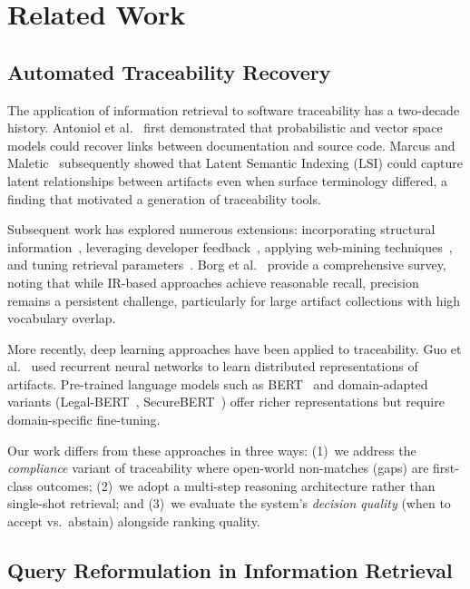 \documentclass{sn-jnl}
\begin{document}
\section{Related Work}
\label{sec:related}

\subsection{Automated Traceability Recovery}

The application of information retrieval to software traceability has a two-decade history.
Antoniol et al.~\cite{Antoniol2002} first demonstrated that probabilistic and vector space models could recover links between documentation and source code.
Marcus and Maletic~\cite{MarcusMaletic2003} subsequently showed that Latent Semantic Indexing (LSI) could capture latent relationships between artifacts even when surface terminology differed, a finding that motivated a generation of traceability tools.

Subsequent work has explored numerous extensions: incorporating structural information~\cite{McMillan2009}, leveraging developer feedback~\cite{Cuddeback2010}, applying web-mining techniques~\cite{Ali2013}, and tuning retrieval parameters~\cite{Oliveto2010}.
Borg et al.~\cite{Borg2014} provide a comprehensive survey, noting that while IR-based approaches achieve reasonable recall, precision remains a persistent challenge, particularly for large artifact collections with high vocabulary overlap.

More recently, deep learning approaches have been applied to traceability.
Guo et al.~\cite{Guo2017} used recurrent neural networks to learn distributed representations of artifacts.
Pre-trained language models such as BERT~\cite{Devlin2019} and domain-adapted variants (Legal-BERT~\cite{Chalkidis2020}, SecureBERT~\cite{Aghaei2022}) offer richer representations but require domain-specific fine-tuning.

Our work differs from these approaches in three ways: (1)~we address the \emph{compliance} variant of traceability where open-world non-matches (gaps) are first-class outcomes; (2)~we adopt a multi-step reasoning architecture rather than single-shot retrieval; and (3)~we evaluate the system's \emph{decision quality} (when to accept vs.\ abstain) alongside ranking quality.

\subsection{Query Reformulation in Information Retrieval}
\end{document}
